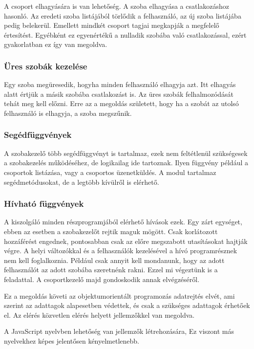 \documentclass[bibliography=totocnumbered]{article}
\begin{document}
A csoport elhagyására is van lehetőség. A szoba elhagyása a
csatlakozáshoz hasonló. Az eredeti szoba listájából törlődik a
felhasználó, az új szoba listájába pedig belekerül. Emellett mindkét
csoport tagjai megkapják a megfelelő értesítést. Egyébként ez
egyenértékű a nulladik szobába való csatlakozással, ezért gyakorlatban
ez így van megoldva.


\subsubsection{Üres szobák
kezelése}

Egy szoba megüresedik, hogyha minden felhasználó elhagyja azt. Itt
elhagyás alatt értjük a másik szobába csatlakozást is. Az üres szobák
felhalmozódását tehát meg kell előzni. Erre az a megoldás született,
hogy ha a szobát az utolsó felhasználó is elhagyja, a szoba megszűnik.


\subsubsection{Segédfüggvények}

A szobakezelő több segédfüggvényt is tartalmaz, ezek nem feltétlenül
szükségesek a szobakezelés működéséhez, de logikailag ide tartoznak.
Ilyen függvény például a csoportok listázása, vagy a csoportos
üzenetküldés. A modul tartalmaz segédmetódusokat, de a legtöbb kívülről
is elérhető.


\subsubsection{Hívható
függvények}

A kiszolgáló minden részprogramjából elérhető hívások ezek. Egy zárt
egységet, ebben az esetben a szobakezelőt rejtik maguk mögött. Csak
korlátozott hozzáférést engednek, pontosabban csak az előre megszabott
utasításokat hajtják végre. A helyi változókkal és a felhasználók
kezelésével a hívó programrésznek nem kell foglalkoznia. Például csak
annyit kell mondanunk, hogy az adott felhasználót az adott szobába
szeretnénk rakni. Ezzel mi végeztünk is a feladattal. A csoportkezelő
majd gondoskodik annak elvégzéséről.

Ez a megoldás követi az objektumorientált programozás adatrejtés elvét,
ami szerint az adattagok alapesetben védettek, és csak a szükséges
adattagok érhetőek el. Az elérés közvetlen elérés helyett jellemzőkkel
van megoldva.

A JavaScript nyelvben lehetőség van jellemzők létrehozására, Ez viszont
más nyelvekhez képes jelentősen kényelmetlenebb.
\end{document}
